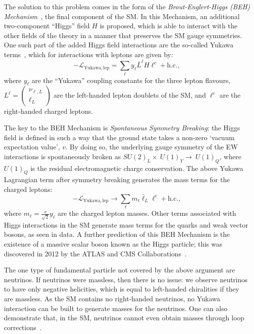 The solution to this problem comes in the form of the \textit{Brout-Englert-Higgs (BEH) Mechanism}~\cite{}, %
the final component of the SM.  In this Mechanism, an additional two-component ``Higgs'' field $H$ is proposed, which is able to interact with the other fields of the theory in a manner that preserves the SM gauge symmetries. One such part of the added Higgs field interactions are the so-called Yukawa terms~\cite{}, %
which for interactions with leptons are given by:
\begin{equation}
    -\mathcal{L}_{\mathrm{Yukawa,lep}} = \sum_{\ell}y_{\ell}\bar{L}^{\ell}H\ell^{c} + \mathrm{h.c.},
\end{equation}
where $y_{\ell}$ are the ``Yukawa'' coupling constants for the three lepton flavours, $L^{\ell} = \begin{pmatrix}
    \nu_{\ell,L} \\ \ell_{L}
\end{pmatrix}$ are the left-handed lepton doublets of the SM, and $\ell^{c}$ are the right-handed charged leptons.

The key to the BEH Mechanism is \textit{Spontaneous Symmetry Breaking}: the Higgs field is defined in such a way that the ground state takes a non-zero `vacuum expectation value', $v$. By doing so, the underlying gauge symmetry of the EW interactions is spontaneously broken as $SU(2)_{L}\times~U(1)_{Y}\to~U(1)_{Q}$, where $U(1)_{Q}$ is the residual electromagnetic charge conservation. The above Yukawa Lagrangian term after symmetry breaking generates the mass terms for the charged leptons:
\begin{equation}
    -\mathcal{L}_{\mathrm{Yukawa,lep}} \to \sum_{\ell}m_{\ell}\bar{\ell}_{L}\ell^{c} + \mathrm{h.c.},
\end{equation}
where $m_{\ell} = \frac{v}{\sqrt{2}}y_{\ell}$ are the charged lepton masses. Other terms associated with Higgs interactions in the SM generate mass terms for the quarks and weak vector bosons, as seen in data. A further prediction of this BEH Mechanism is the existence of a massive scalar boson known as the Higgs particle; this was discovered in 2012 by the ATLAS and CMS Collaborations~\cite{}. %

The one type of fundamental particle not covered by the above argument are neutrinos. If neutrinos were massless, then there is no issue: we observe neutrinos to have only negative helicities, which is equal to left-handed chiralities if they are massless. As the SM contains no right-handed neutrinos, no Yukawa interaction can be built to generate masses for the neutrinos. One can also demonstrate that, in the SM, neutrinos cannot even obtain masses through loop corrections~\cite{}. %

